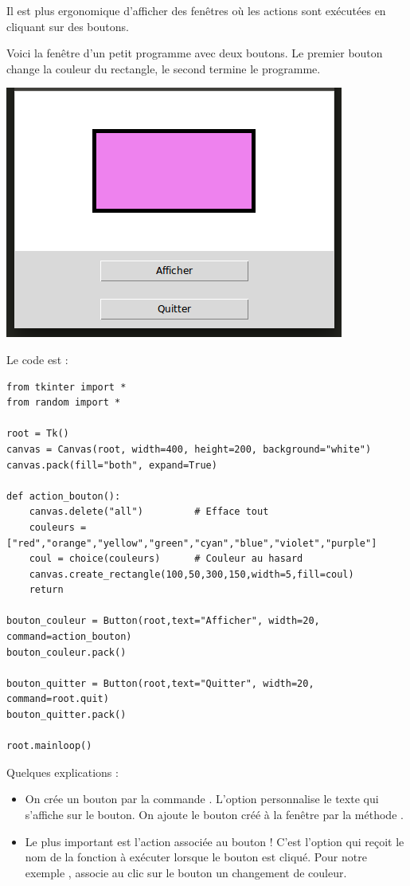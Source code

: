 \documentclass[11pt,class=report,crop=false]{standalone}
\begin{document}
\begin{cours}


Il est plus ergonomique d'afficher des fenêtres où les actions sont exécutées en cliquant sur des boutons.

Voici la fenêtre d'un petit programme avec deux boutons. Le premier bouton change la couleur du rectangle, le second termine le programme.
\begin{center}
\includegraphics[scale=0.6]{ecran-stat-cours-boutons}
\end{center}
Le code est :
\begin{lstlisting}
from tkinter import *
from random import *

root = Tk()     
canvas = Canvas(root, width=400, height=200, background="white")
canvas.pack(fill="both", expand=True)

def action_bouton():
    canvas.delete("all")         # Efface tout
    couleurs = ["red","orange","yellow","green","cyan","blue","violet","purple"]
    coul = choice(couleurs)      # Couleur au hasard
    canvas.create_rectangle(100,50,300,150,width=5,fill=coul)
    return

bouton_couleur = Button(root,text="Afficher", width=20, command=action_bouton)
bouton_couleur.pack()

bouton_quitter = Button(root,text="Quitter", width=20, command=root.quit)
bouton_quitter.pack()

root.mainloop()
\end{lstlisting}

Quelques explications :
\begin{itemize}
  \item On crée un bouton par la commande . L'option  personnalise le texte qui s'affiche sur le bouton. On ajoute le bouton créé à la fenêtre par la méthode .
  \item Le plus important est l'action associée au bouton ! C'est l'option  qui reçoit le nom de la fonction à exécuter lorsque le bouton est cliqué. Pour notre exemple , associe au clic sur le bouton un changement de couleur.
  

\end{itemize}
\end{cours}
\end{document}

